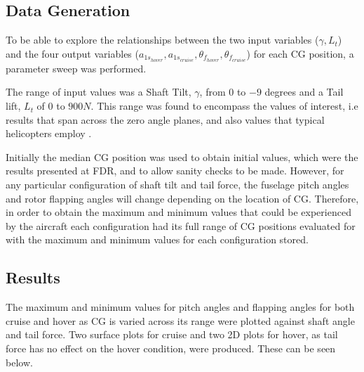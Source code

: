 \documentclass[11pt,a4paper]{article}
\begin{document}
\subsection{Data Generation}
To be able to explore the relationships between the two input variables ($\gamma,L_t$) and the  four output variables ($a_{1s_{hover}},a_{1s_{cruise}},\theta_{f_{hover}},\theta_{f_{cruise}}$) for each CG position, a parameter sweep was performed.

The range of input values was a Shaft Tilt, $\gamma$, from $0$ to $-9$ degrees and a Tail lift, $L_t$ of $0$ to $900N$. This range was found to encompass the values of interest, i.e results that span across the zero angle planes, and also values that typical helicopters employ \cite{prouty}.

Initially the median CG position was used to obtain initial values, which were the results presented at FDR, and to allow sanity checks to be made. However, for any particular configuration of shaft tilt and tail force, the fuselage pitch angles and rotor flapping angles will change depending on the location of CG. Therefore, in order to obtain the maximum and minimum values that could be experienced by the aircraft each configuration had its full range of CG positions evaluated for with the maximum and minimum values for each configuration stored.

\subsection{Results}

The maximum and minimum values for pitch angles and flapping angles for both cruise and hover as CG is varied across its range were plotted against shaft angle and tail force. Two surface plots for cruise and two 2D plots for hover, as tail force has no effect on the hover condition, were produced. These can be seen below.
\end{document}

